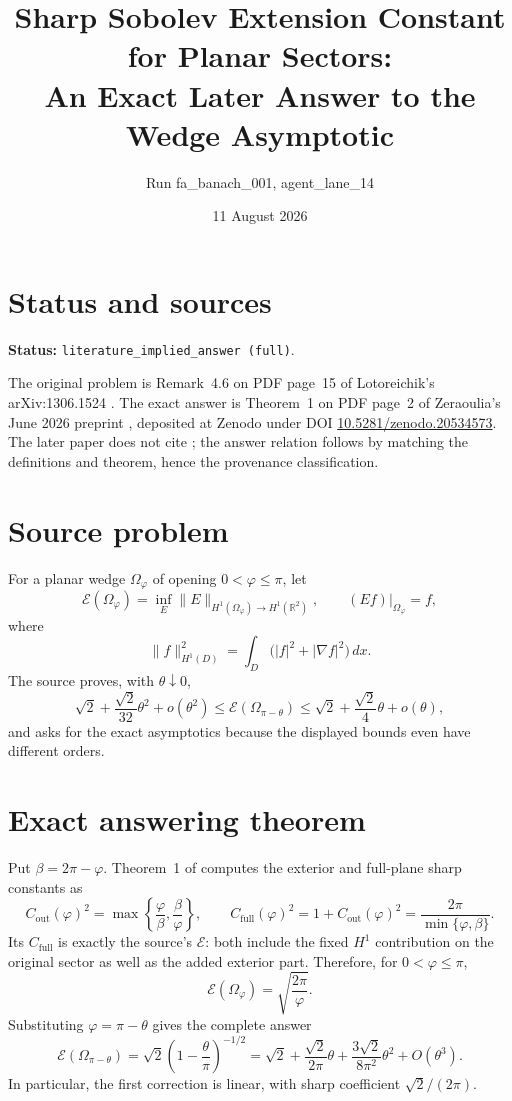 \documentclass[11pt]{article}
\title{Sharp Sobolev Extension Constant for Planar Sectors:\\
An Exact Later Answer to the Wedge Asymptotic}
\author{Run fa\_banach\_001, agent\_lane\_14}
\date{11 August 2026}
\begin{document}
\maketitle

\section*{Status and sources}

\textbf{Status:} \texttt{literature\_implied\_answer (full)}.

The original problem is Remark~4.6 on PDF page~15 of Lotoreichik's
arXiv:1306.1524 \cite{Lot}.  The exact answer is Theorem~1 on PDF page~2 of
Zeraoulia's June 2026 preprint \cite{Zer}, deposited at Zenodo under DOI
\href{https://doi.org/10.5281/zenodo.20534573}{10.5281/zenodo.20534573}.
The later paper does not cite \cite{Lot}; the answer relation follows by
matching the definitions and theorem, hence the provenance classification.

\section*{Source problem}

For a planar wedge $\Omega_\varphi$ of opening $0<\varphi\leq\pi$, let
\[
 \mathcal E(\Omega_\varphi)
 =\inf_E\|E\|_{H^1(\Omega_\varphi)\to H^1(\mathbb R^2)},
 \qquad (Ef)|_{\Omega_\varphi}=f,
\]
where
\[
 \|f\|_{H^1(D)}^2=\int_D\bigl(|f|^2+|\nabla f|^2\bigr)\,dx.
\]
The source proves, with $\theta\downarrow0$,
\[
 \sqrt2+\frac{\sqrt2}{32}\theta^2+o(\theta^2)
 \leq \mathcal E(\Omega_{\pi-\theta})
 \leq \sqrt2+\frac{\sqrt2}{4}\theta+o(\theta),
\]
and asks for the exact asymptotics because the displayed bounds even have
different orders.

\section*{Exact answering theorem}

Put $\beta=2\pi-\varphi$.  Theorem~1 of \cite{Zer} computes the exterior and
full-plane sharp constants as
\[
 C_{\mathrm{out}}(\varphi)^2
 =\max\left\{\frac{\varphi}{\beta},\frac{\beta}{\varphi}\right\},
 \qquad
 C_{\mathrm{full}}(\varphi)^2=1+C_{\mathrm{out}}(\varphi)^2
 =\frac{2\pi}{\min\{\varphi,\beta\}}.
\]
Its $C_{\mathrm{full}}$ is exactly the source's $\mathcal E$: both include the
fixed $H^1$ contribution on the original sector as well as the added exterior
part.  Therefore, for $0<\varphi\leq\pi$,
\[
 \boxed{\mathcal E(\Omega_\varphi)=\sqrt{\frac{2\pi}{\varphi}}}.
\]
Substituting $\varphi=\pi-\theta$ gives the complete answer
\[
 \mathcal E(\Omega_{\pi-\theta})
 =\sqrt2\left(1-\frac{\theta}{\pi}\right)^{-1/2}
 =\sqrt2+\frac{\sqrt2}{2\pi}\theta
 +\frac{3\sqrt2}{8\pi^2}\theta^2+O(\theta^3).
\]
In particular, the first correction is linear, with sharp coefficient
$\sqrt2/(2\pi)$.
\end{document}
